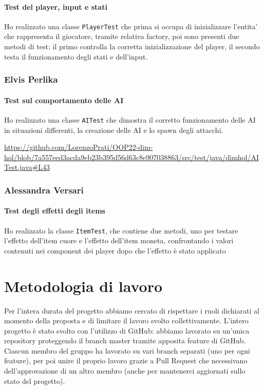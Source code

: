 \documentclass[a4paper,12pt]{report}
\begin{document}
\paragraph*{Test del player, input e stati}
Ho realizzato una classe \texttt{PlayerTest} che prima si occupa di inizializzare l'entita' che rappresenta il giocatore, tramite relativa factory, poi sono presenti due metodi di test: il primo controlla la corretta inizializzazione del player, il secondo testa il funzionamento degli stati e dell'input. 

\subsubsection*{Elvis Perlika}
\paragraph*{Test sul comportamento delle AI}
Ho realizzato una classe \texttt{AITest} che dimostra il corretto funzionamento delle AI in
situazioni differenti, la creazione delle AI e lo spawn degli attacchi.

\url{https://github.com/LorenzoPrati/OOP22-dim-hol/blob/7a557eed3acda9eb23b395d56d63c8e907038863/src/test/java/dimhol/AITest.java#L43}

\subsubsection*{Alessandra Versari}

\paragraph*{Test degli effetti degli items}
Ho realizzato la classe \texttt{ItemTest}, che contiene due metodi, uno per testare l'effetto dell'item cuore e l'effetto dell'item moneta, confrontando i valori contenuti nei component dei player dopo che l'effetto è stato applicato


\section{Metodologia di lavoro}
Per l'intera durata del progetto abbiamo cercato di rispettare i ruoli dichiarati al momento della proposta e di limitare il lavoro svolto collettivamente. 
L'intero progetto è stato svolto con l'utilizzo di GitHub: abbiamo lavorato su un'unica repository proteggendo il branch master tramite apposita feature di GitHub.
Ciascun membro del gruppo ha lavorato su vari branch separati (uno per ogni feature), per poi unire il proprio lavoro grazie a Pull Request che necessivano dell'approvazione di un altro membro (anche per mantenerci aggiornati sullo stato del progetto).
\end{document}
